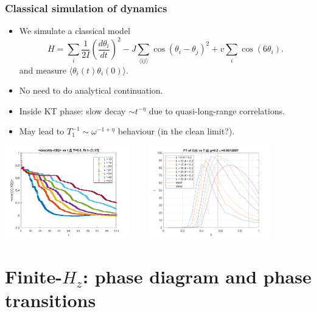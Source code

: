 \documentclass[xcolor=table, aspectratio=1610,ignorenonframetext]{beamer}
\begin{document}
\begin{frame}
  \frametitle{Classical simulation of dynamics}
  \begin{itemize}
  \item We simulate a classical model
    \[H = \sum_i\frac1{2I}\left(\frac{d\theta_i}{dt}\right)^2
      -J\sum_{\langle ij\rangle}\cos(\theta_i-\theta_j)^2
      +v\sum_i\cos(6\theta_i).\]
    and measure $\langle\theta_i(t)\theta_i(0)\rangle$.
  \item No need to do analytical continuation.
  \item Inside KT phase: slow decay $\sim t^{-\eta}$ due to quasi-long-range correlations.
  \item May lead to $T_1^{-1}\sim \omega^{-1+\eta}$ behaviour (in the clean limit?).
  \end{itemize}
  \begin{center}
    \includegraphics[height=4cm]{cl-decay}~~~~
    \includegraphics[height=4cm]{t1-cl}
  \end{center}
\end{frame}

\section{Finite-$H_z$: phase diagram and phase transitions}
\end{document}
